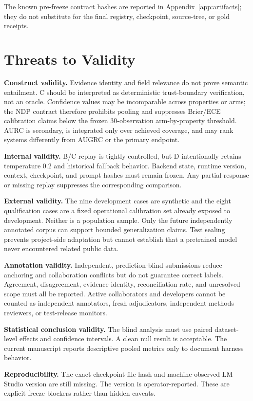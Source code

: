 \documentclass[11pt]{article}
\begin{document}
The known pre-freeze contract hashes are reported in
Appendix~\ref{app:artifacts}; they do not substitute for the final registry,
checkpoint, source-tree, or gold receipts.

\section{Threats to Validity}

\textbf{Construct validity.} Evidence identity and field relevance do not prove
semantic entailment. C should be interpreted as deterministic trust-boundary
verification, not an oracle. Confidence values may be incomparable across
properties or arms; the NDP contract therefore prohibits pooling and suppresses
Brier/ECE calibration claims below the frozen 30-observation arm-by-property
threshold. AURC is secondary, is integrated only over achieved coverage, and
may rank systems differently from AUGRC or the primary endpoint.

\textbf{Internal validity.} B/C replay is tightly controlled, but D intentionally
retains temperature 0.2 and historical fallback behavior. Backend state, runtime
version, context, checkpoint, and prompt hashes must remain frozen. Any partial
response or missing replay suppresses the corresponding comparison.

\textbf{External validity.} The nine development cases are synthetic and the eight
qualification cases are a fixed operational calibration set already exposed to
development. Neither is a population sample. Only the future independently
annotated corpus can support bounded generalization claims. Test sealing prevents
project-side adaptation but cannot establish that a pretrained model never
encountered related public data.

\textbf{Annotation validity.} Independent, prediction-blind submissions reduce
anchoring and collaboration conflicts but do not guarantee correct labels.
Agreement, disagreement, evidence identity, reconciliation rate, and unresolved
scope must all be reported. Active collaborators and developers cannot be counted
as independent annotators, fresh adjudicators, independent methods reviewers, or
test-release monitors.

\textbf{Statistical conclusion validity.} The blind analysis must use paired
dataset-level effects and confidence intervals. A clean null result is acceptable.
The current manuscript reports descriptive pooled metrics only to document harness
behavior.

\textbf{Reproducibility.} The exact checkpoint-file hash and machine-observed LM
Studio version are still missing. The version is operator-reported. These are
explicit freeze blockers rather than hidden caveats.
\end{document}
